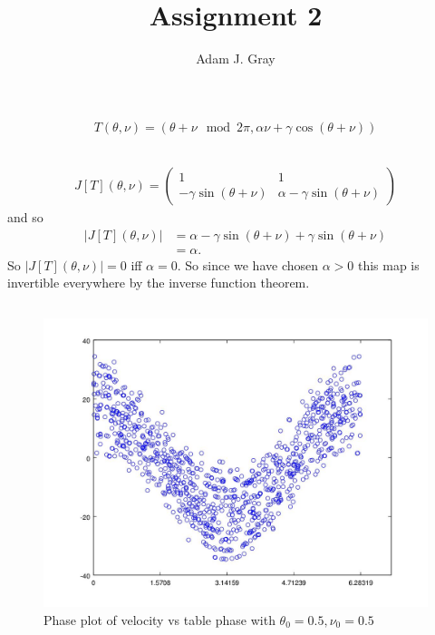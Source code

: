 \documentclass{unswmaths}
\begin{document}
\author{Adam J. Gray}
\title{Assignment 2}
\subject{Ergodic Theory}

\unswtitle

\section{}
\subsection{}
\begin{align*}
    T(\theta, \nu) = (\theta + \nu \mod 2\pi, \alpha\nu + \gamma \cos(\theta + \nu))
\end{align*}
\subsection{}
\begin{align*}
    J[T](\theta, \nu) = \left( 
    \begin{array}{cc}
        1   & 1 \\
        -\gamma \sin(\theta + \nu) & \alpha - \gamma\sin(\theta + \nu)
    \end{array}
    \right)
\end{align*}
and so
\begin{align*}
|J[T](\theta, \nu)| &= \alpha - \gamma\sin(\theta + \nu) + \gamma\sin(\theta + \nu) \\
    &= \alpha.
\end{align*}
So $ |J[T](\theta, \nu)| = 0 $ iff $ \alpha = 0 $. So since we have chosen $ \alpha > 0 $ this map is invertible everywhere by the inverse function theorem.
\subsection{}
\begin{figure}[h]
    \includegraphics[scale=0.5]{Question_3}
    \caption{Phase plot of velocity vs table phase with $ \theta_0 = 0.5, \nu_0 = 0.5 $}
\end{figure}
\end{document}
